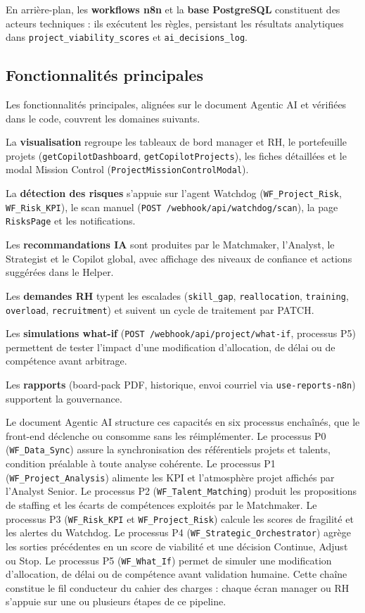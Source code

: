 En arrière-plan, les \textbf{workflows n8n} et la \textbf{base PostgreSQL} constituent des acteurs techniques : ils exécutent les règles, persistant les résultats analytiques dans \texttt{project\_viability\_scores} et \texttt{ai\_decisions\_log}.

\subsection{Fonctionnalités principales}

Les fonctionnalités principales, alignées sur le document Agentic AI et vérifiées dans le code, couvrent les domaines suivants.

La \textbf{visualisation} regroupe les tableaux de bord manager et RH, le portefeuille projets (\texttt{getCopilotDashboard}, \texttt{getCopilotProjects}), les fiches détaillées et le modal Mission Control (\texttt{ProjectMissionControlModal}).

La \textbf{détection des risques} s'appuie sur l'agent Watchdog (\texttt{WF\_Project\_Risk}, \texttt{WF\_Risk\_KPI}), le scan manuel (\texttt{POST /webhook/api/watchdog/scan}), la page \texttt{RisksPage} et les notifications.

Les \textbf{recommandations IA} sont produites par le Matchmaker, l'Analyst, le Strategist et le Copilot global, avec affichage des niveaux de confiance et actions suggérées dans le Helper.

Les \textbf{demandes RH} typent les escalades (\texttt{skill\_gap}, \texttt{reallocation}, \texttt{training}, \texttt{overload}, \texttt{recruitment}) et suivent un cycle de traitement par PATCH.

Les \textbf{simulations what-if} (\texttt{POST /webhook/api/project/what-if}, processus P5) permettent de tester l'impact d'une modification d'allocation, de délai ou de compétence avant arbitrage.

Les \textbf{rapports} (board-pack PDF, historique, envoi courriel via \texttt{use-reports-n8n}) supportent la gouvernance.

Le document Agentic AI structure ces capacités en six processus enchaînés, que le front-end déclenche ou consomme sans les réimplémenter. Le processus P0 (\texttt{WF\_Data\_Sync}) assure la synchronisation des référentiels projets et talents, condition préalable à toute analyse cohérente. Le processus P1 (\texttt{WF\_Project\_Analysis}) alimente les KPI et l'atmosphère projet affichés par l'Analyst Senior. Le processus P2 (\texttt{WF\_Talent\_Matching}) produit les propositions de staffing et les écarts de compétences exploités par le Matchmaker. Le processus P3 (\texttt{WF\_Risk\_KPI} et \texttt{WF\_Project\_Risk}) calcule les scores de fragilité et les alertes du Watchdog. Le processus P4 (\texttt{WF\_Strategic\_Orchestrator}) agrège les sorties précédentes en un score de viabilité et une décision Continue, Adjust ou Stop. Le processus P5 (\texttt{WF\_What\_If}) permet de simuler une modification d'allocation, de délai ou de compétence avant validation humaine. Cette chaîne constitue le fil conducteur du cahier des charges : chaque écran manager ou RH s'appuie sur une ou plusieurs étapes de ce pipeline.

